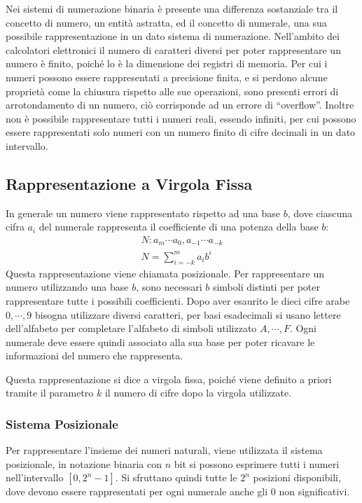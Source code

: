 \documentclass{article}
\numberwithin{equation}{subsection}
\begin{document}
Nei sistemi di numerazione binaria è presente una differenza sostanziale tra il concetto di numero, un entità astratta, ed il concetto di numerale, 
una sua possibile rappresentazione in un dato sistema di numerazione. 
Nell'ambito dei calcolatori elettronici il numero di caratteri diversi per poter rappresentare un numero è finito, poiché lo è la dimensione dei registri di memoria. Per cui 
i numeri possono essere rappresentati a precisione finita, e si perdono alcune proprietà come la chiusura rispetto alle sue operazioni, sono presenti errori di arrotondamento di 
un numero, ciò corrisponde ad un errore di ``overflow''. Inoltre non è possibile rappresentare tutti i numeri reali, essendo infiniti, per cui possono essere rappresentati solo 
numeri con un numero finito di cifre decimali in un dato intervallo. 

\subsection{Rappresentazione a Virgola Fissa}

In generale un numero viene rappresentato rispetto ad una base $b$, dove ciascuna cifra $a_i$ del numerale rappresenta il coefficiente di una potenza della base $b$:
\begin{gather*}
    N:a_m\cdots a_0,a_{-1}\cdots a_{-k}\\
    N=\displaystyle\sum_{i=-k}^ma_ib^i
\end{gather*}
Questa rappresentazione viene chiamata posizionale. 
Per rappresentare un numero utilizzando una base $b$, sono necessari $b$ simboli distinti per poter rappresentare tutte i possibili coefficienti. Dopo aver 
esaurito le dieci cifre arabe $0,\cdots,9$ bisogna utilizzare diversi caratteri, per basi esadecimali si usano lettere dell'alfabeto per completare l'alfabeto di simboli 
utilizzato $A,\cdots,F$. 
Ogni numerale deve essere quindi associato alla sua base per poter ricavare le informazioni del numero che rappresenta.  

Questa rappresentazione si dice a virgola fissa, poiché viene definito a priori tramite il parametro $k$ il numero di cifre dopo la virgola utilizzate. 

\subsubsection{Sistema Posizionale}
Per rappresentare l'insieme dei numeri naturali, viene utilizzata il sistema posizionale, in notazione binaria con $n$ bit si possono esprimere tutti i numeri nell'intervallo 
$[0,2^n-1]$. Si sfruttano quindi tutte le $2^n$ posizioni disponibili, dove devono essere rappresentati per ogni numerale anche gli $0$ non significativi.  
\end{document}
